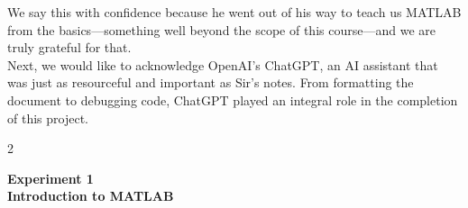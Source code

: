 \documentclass[12pt]{report}
\begin{document}
  We say this with confidence because he went out of his way to teach us MATLAB from the basics—something well beyond the scope of this course—and we are truly grateful for that. \\

Next, we would like to acknowledge OpenAI's ChatGPT, an AI assistant that was just as resourceful and important as Sir’s notes. From formatting the document to debugging code, ChatGPT played an integral role in the completion of this project.

  \newpage

  \begin{spacing}{2}
    \tableofcontents
  \end{spacing}

  \newpage 
  \begin{center}
    \textbf{\LARGE Experiment 1} \\
    \vspace{0.2cm}
    \textbf{\large Introduction to MATLAB}
  \end{center}
\end{document}
